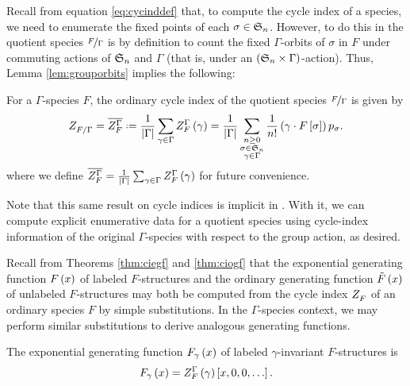 \documentclass[distribution,draft]{brandiss} %
\numberwithin{section}{chapter}
\numberwithin{figure}{chapter}
\begin{document}
Recall from equation \eqref{eq:cycinddef} that, to compute the cycle index of a species, we need to enumerate the fixed points of each $\sigma \in  \mathfrak{S}_{n} $.
However, to do this in the quotient species $\nicefrac{F}{\Gamma}$ is by definition to count the fixed $\Gamma$-orbits of $\sigma$ in $F$ under commuting actions of $ \mathfrak{S}_{n} $ and $\Gamma$ (that is, under an $\left( { \mathfrak{S}_{n}  \times \Gamma} \right)$-action).
Thus, Lemma \ref{lem:grouporbits} implies the following:
\begin{theorem}\label{thm:qsci}
  For a $\Gamma$-species $F$, the ordinary cycle index of the quotient species $\nicefrac{F}{\Gamma}$ is given by 
  \begin{equation}
    \label{eq:quotcycind}
    \ci{F / \Gamma} = \qgci{\Gamma}{F} \defeq \frac{1}{\abs{\Gamma}} \sum_{\gamma \in \Gamma} \gcielt{\Gamma}{F}{\gamma} = \frac{1}{\abs{\Gamma}} \sum_{\substack{n \geq 0 \\ \sigma \in \symgp{n} \\ \gamma \in \Gamma}} \frac{1}{n!} \pbrac{\gamma \cdot F \sbrac{\sigma}} p_{\sigma}.
  \end{equation}
  where we define $ \overline{  Z_{F}^{{\Gamma} {}}  }  = \frac{1}{\left\vert {\Gamma} \right\vert} \sum_{\gamma \in \Gamma}  Z_{F}^{{\Gamma} {}}  \left( {\gamma} \right)$ for future convenience.
\end{theorem}
Note that this same result on cycle indices is implicit in \cite[\S 2.2.3]{bous:species}.
With it, we can compute explicit enumerative data for a quotient species using cycle-index information of the original $\Gamma$-species with respect to the group action, as desired.

Recall from Theorems \ref{thm:ciegf} and \ref{thm:ciogf} that the exponential generating function $F \left( {x} \right)$ of labeled $F$-structures and the ordinary generating function $\tilde{F} \left( {x} \right)$ of unlabeled $F$-structures may both be computed from the cycle index $ Z_{F}^{} $ of an ordinary species $F$ by simple substitutions.
In the $\Gamma$-species context, we may perform similar substitutions to derive analogous generating functions.

\begin{theorem}
  \label{thm:gciegf}
  The exponential generating function $F_{\gamma} \left( {x} \right)$ of labeled $\gamma$-invariant $F$-structures is
  \begin{equation}
    \label{eq:gciegf}
    F_{\gamma} \left( {x} \right) =  Z_{F}^{{\Gamma} {}}  \left( {\gamma} \right) \left[ {x, 0, 0, \dots} \right].
  \end{equation}
\end{theorem}
\end{document}
